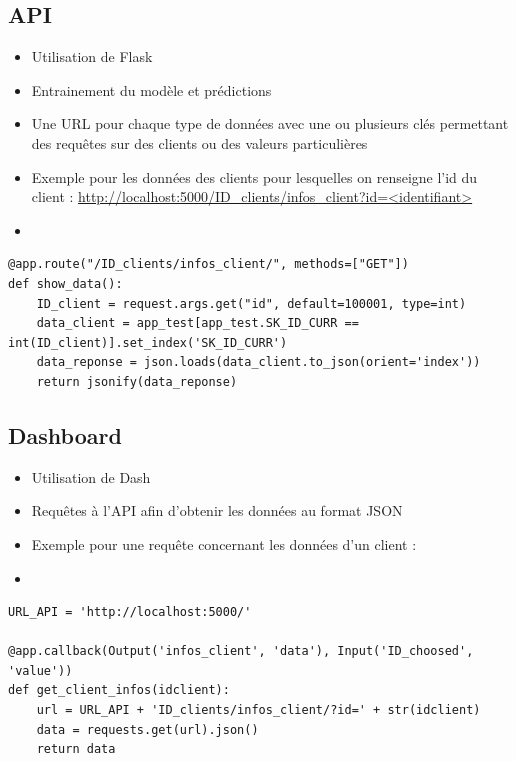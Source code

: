 \documentclass[8pt,aspectratio=169,hyperref={unicode=true}]{beamer}
\begin{document}
\subsection{API}
\begin{frame}[fragile]{\insertsection}{\insertsubsection}
    \begin{itemize}
        \item Utilisation de Flask
        \item Entrainement du modèle et prédictions
        \item Une URL pour chaque type de données avec une ou plusieurs clés permettant des requêtes sur des clients ou des valeurs particulières
        \item Exemple pour les données des clients pour lesquelles on renseigne l'id du client : \url{http://localhost:5000/ID_clients/infos_client?id=<identifiant>}
        \item[]
    \end{itemize}
    \begin{verbatim}
@app.route("/ID_clients/infos_client/", methods=["GET"])
def show_data():
    ID_client = request.args.get("id", default=100001, type=int)
    data_client = app_test[app_test.SK_ID_CURR == int(ID_client)].set_index('SK_ID_CURR')
    data_reponse = json.loads(data_client.to_json(orient='index'))
    return jsonify(data_reponse)    
    \end{verbatim}
\end{frame}

\subsection{Dashboard}
\begin{frame}[fragile]{\insertsection}{\insertsubsection}
    \begin{itemize}
        \item Utilisation de Dash
        \item Requêtes à l'API afin d'obtenir les données au format JSON
        \item Exemple pour une requête concernant les données d'un client :
        \item[]
    \end{itemize}
    \begin{verbatim}
URL_API = 'http://localhost:5000/'

@app.callback(Output('infos_client', 'data'), Input('ID_choosed', 'value'))
def get_client_infos(idclient):
    url = URL_API + 'ID_clients/infos_client/?id=' + str(idclient)
    data = requests.get(url).json()
    return data 
            \end{verbatim}
\end{frame}
\end{document}
